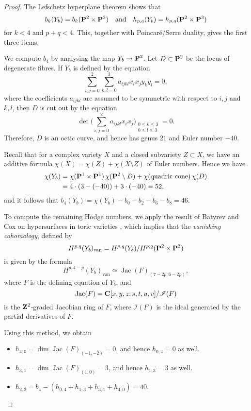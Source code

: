 \begin{proof}
    The Lefschetz hyperplane theorem shows that
    \[ b_k (Y_b) = b_k (\bbP^2 \times \bbP^3) \quad \text{and} \quad
        h_{p,q} (Y_b) = h_{p,q} (\bbP^2 \times \bbP^3) \]
    for $k < 4$ and $p + q < 4$.
    This, together with Poincaré/Serre duality, gives the first three items.

    We compute $b_4$ by analysing the map $Y_b \to \bbP^2$.
    Let $D \subset \bbP^2$ be the locus of degenerate fibres.
    If $Y_b$ is defined by the equation
    \[\textstyle \sum_{i,j=0}^2 \sum_{k,l=0}^3 a_{ijkl} x_i x_j y_k y_l = 0, \]
    where the coefficients $a_{ijkl}$ are assumed to be symmetric with respect to $i,j$ and $k,l$,
    then $D$ is cut out by the equation
    \[\textstyle \det {} \bigl( \sum_{i,j=0}^2 a_{ijkl} x_i x_j \bigr) _{\substack{0 \leq k \leq 3 \\ 0 \leq l \leq 3}} = 0. \]
    Therefore, $D$ is an octic curve, and hence has genus $21$ and Euler number $-40$.

    Recall that for a complex variety $X$ and a closed subvariety $Z \subset X$,
    we have an additive formula $\chi (X) = \chi (Z) + \chi (X \setminus Z)$ of Euler numbers.
    Hence we have
    \[ \begin{aligned}
        \chi (Y_b)
        & = \chi ( \bbP^1 \times \bbP^1 ) \, \chi ( \bbP^2 \setminus D ) 
        + \chi ( \text{quadric cone} ) \, \chi (D) \\
        & = 4 \cdot (3 - (-40)) + 3 \cdot (-40) = 52,
    \end{aligned} \]
    and it follows that $b_4 (Y_b) = \chi (Y_b) - b_0 - b_2 - b_6 - b_8 = 46$.

    To compute the remaining Hodge numbers,
    we apply the result of Batyrev and Cox on hypersurfaces in toric varieties \cite[Theorem~10.13]{batyrev-cox},
    which implies that the \emph{vanishing cohomology}, defined by
    \[ H^{p,q} (Y_b)_{\mathrm{van}} = H^{p,q} (Y_b) / H^{p,q} (\bbP^2 \times \bbP^3) \]
    is given by the formula
    \[ H^{p,4-p} (Y_b)_{\mathrm{van}} \simeq \operatorname{Jac}(F)_{(7-2p,6-2p)}, \]
    where $F$ is the defining equation of $Y_b$, and
    \[ \operatorname{Jac} (F) = \bbC [x,y,z;s,t,u,v] / \mathscr{I}(F) \]
    is the $\bbZ^2$-graded Jacobian ring of $F$, 
    where $\mathscr{I}(F)$ is the ideal generated by the partial derivatives of $F$.

    Using this method, we obtain
    \begin{itemize}
        \item
            $h_{4,0} = \dim \operatorname{Jac}(F)_{(-1,-2)} = 0$, and hence $h_{0,4} = 0$ as well.
        \item
            $h_{3,1} = \dim \operatorname{Jac}(F)_{(1,0)} = 3$, and hence $h_{1,3} = 3$ as well.
        \item
            $h_{2,2} = b_4 - (h_{0,4} + h_{1,3} + h_{3,1} + h_{4,0}) = 40$. \qedhere
    \end{itemize}
\end{proof}


